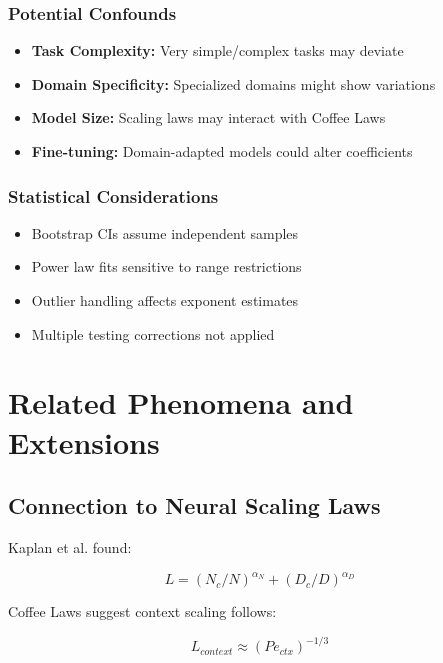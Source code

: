 \documentclass[conference]{IEEEtran}
\begin{document}
\subsubsection{Potential Confounds}

\begin{itemize}
\item \textbf{Task Complexity:} Very simple/complex tasks may deviate
\item \textbf{Domain Specificity:} Specialized domains might show variations
\item \textbf{Model Size:} Scaling laws may interact with Coffee Laws
\item \textbf{Fine-tuning:} Domain-adapted models could alter coefficients
\end{itemize}

\subsubsection{Statistical Considerations}

\begin{itemize}
\item Bootstrap CIs assume independent samples
\item Power law fits sensitive to range restrictions
\item Outlier handling affects exponent estimates
\item Multiple testing corrections not applied
\end{itemize}

\section{Related Phenomena and Extensions}

\subsection{Connection to Neural Scaling Laws}

Kaplan et al. \cite{kaplan2020scaling} found:

\begin{equation}
L = (N_c/N)^{\alpha_N} + (D_c/D)^{\alpha_D}
\end{equation}

Coffee Laws suggest context scaling follows:

\begin{equation}
L_{context} \approx (Pe_{ctx})^{-1/3}
\end{equation}
\end{document}
